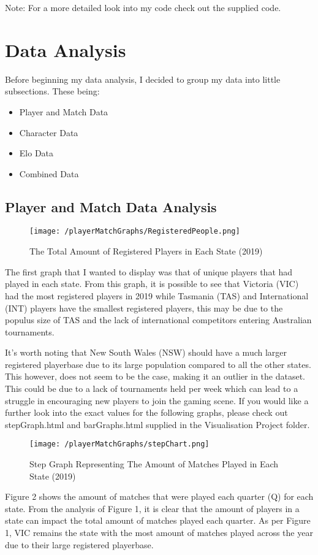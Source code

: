 \documentclass[11pt, oneside, a4paper]{article}
\begin{document}
Note: For a more detailed look into my code check out the supplied code.
\newpage

\section{Data Analysis}
Before beginning my data analysis, I decided to group my data into little subsections. These being:
\begin{itemize}
	\item{Player and Match Data}
	\item{Character Data}
	\item{Elo Data}
	\item{Combined Data}
\end{itemize}


\subsection{Player and Match Data Analysis}
\begin{figure}[!ht]
	\centerline{\texttt{[image: /playerMatchGraphs/RegisteredPeople.png]}}
	\caption{The Total Amount of Registered Players in Each State (2019)}
	\label{fig:figure1}
\end{figure}
The first graph that I wanted to display was that of unique players that had played in each state. From this graph, it is possible to see that Victoria (VIC) had the most registered players in 2019 while Tasmania (TAS) and International (INT) players have the smallest registered players, this may be due to the populus size of TAS and the lack of international competitors entering Australian tournaments. 

It's worth noting that New South Wales (NSW) should have a much larger registered playerbase due to its large population compared to all the other states. This however, does not seem to be the case, making it an outlier in the dataset. This could be due to a lack of tournaments held per week which can lead to a struggle in encouraging new players to join the gaming scene. If you would like a further look into the exact values for the following graphs, please check out stepGraph.html and barGraphs.html supplied in the Visualisation Project folder.

\newpage

\begin{figure}[!ht]
	\centerline{\texttt{[image: /playerMatchGraphs/stepChart.png]}}
	\caption{Step Graph Representing The Amount of Matches Played in Each State (2019)}
	\label{fig:figure2}
\end{figure}
Figure 2 shows the amount of matches that were played each quarter (Q) for each state. From the analysis of Figure 1, it is clear that the amount of players in a state can impact the total amount of matches played each quarter. As per Figure 1, VIC remains the state with the most amount of matches played across the year due to their large registered playerbase. 
\end{document}

